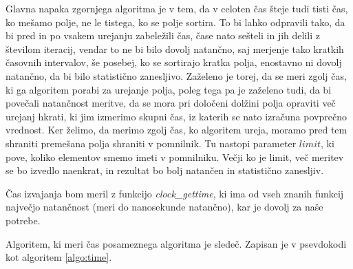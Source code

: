 \documentclass[a4paper,oneside,12pt]{article}
\begin{document}
Glavna napaka zgornjega algoritma je v tem, da v celoten čas šteje tudi tisti čas, ko
mešamo polje, ne le tistega, ko se polje sortira. To bi lahko odpravili tako, da bi pred
in po vsakem urejanju zabeležili čas, čase nato sešteli in jih delili z številom iteracij,
vendar to ne bi bilo dovolj natančno, saj merjenje tako kratkih časovnih intervalov,
še posebej, ko se sortirajo kratka polja, enostavno ni dovolj natančno, da bi bilo
statistično zanesljivo. Zaželeno je torej, da se meri zgolj čas, ki ga algoritem porabi za
urejanje polja, poleg tega pa je zaželeno tudi, da bi povečali natančnost meritve, da se mora
pri določeni dolžini polja opraviti več urejanj hkrati, ki jim izmerimo skupni čas, iz katerih se nato izračuna povprečno
vrednost. Ker želimo, da merimo zgolj čas, ko algoritem ureja, moramo pred tem shraniti
premešana polja shraniti v pomnilnik. Tu nastopi parameter $limit$, ki pove, koliko
elementov smemo imeti v pomnilniku. Večji ko je limit, več meritev se bo izvedlo naenkrat,
in rezultat bo bolj natančen in statistično zanesljiv.

Čas izvajanja bom meril z funkcijo \emph{clock\_gettime}, ki ima od vseh znanih
funkcij največjo natančnost (meri do nanosekunde natančno), kar je dovolj
za naše potrebe.

Algoritem, ki meri čas posameznega algoritma je sledeč. Zapisan je v psevdokodi kot
algoritem \ref{algo:time}.
\end{document}
